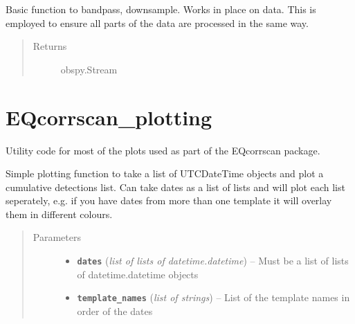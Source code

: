 \documentclass[a4paper,10pt,english]{sphinxmanual}
\begin{document}
\begin{fulllineitems}
\label{modules:pre_processing.shortproc}
Basic function to bandpass, downsample.  Works in place
on data.  This is employed to ensure all parts of the data are processed
in the same way.
\begin{quote}\begin{description}
\item[{Returns}] \leavevmode
obspy.Stream

\end{description}\end{quote}

\end{fulllineitems}



\section{EQcorrscan\_plotting}
\label{modules:module-EQcorrscan_plotting}\label{modules:eqcorrscan-plotting}
Utility code for most of the plots used as part of the EQcorrscan package.

\begin{fulllineitems}
\label{modules:EQcorrscan_plotting.cumulative_detections}
Simple plotting function to take a list of UTCDateTime objects and plot
a cumulative detections list.  Can take dates as a list of lists and will
plot each list seperately, e.g. if you have dates from more than one
template it will overlay them in different colours.
\begin{quote}\begin{description}
\item[{Parameters}] \leavevmode\begin{itemize}
\item {} 
\textbf{\texttt{dates}} (\emph{list of lists of datetime.datetime}) -- Must be a list of lists of datetime.datetime objects

\item {} 
\textbf{\texttt{template\_names}} (\emph{list of strings}) -- List of the template names in order of the dates

\end{itemize}

\end{description}\end{quote}

\end{fulllineitems}
\end{document}
